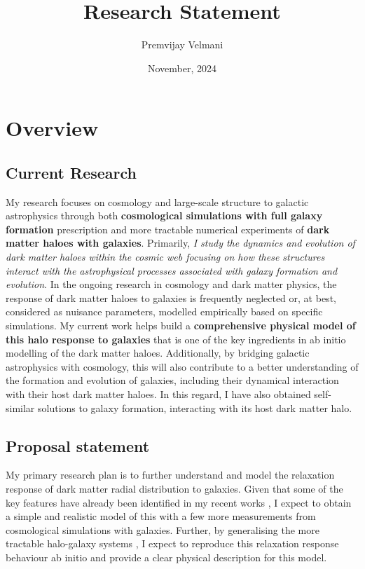 \documentclass[10pt]{article}
\title{Research Statement}
\author{Premvijay Velmani}
\date{November, 2024}
\begin{document}
\maketitle


\section{Overview}
\subsection{Current Research}
My research focuses on cosmology and large-scale structure to galactic astrophysics through both \textbf{cosmological simulations with full galaxy formation} prescription and more tractable numerical experiments of \textbf{dark matter haloes with galaxies}. Primarily, \textit{I study the dynamics and evolution of dark matter haloes within the cosmic web focusing on how these structures interact with the astrophysical processes associated with galaxy formation and evolution}. In the ongoing research in cosmology and dark matter physics, the response of dark matter haloes to galaxies is frequently neglected or, at best, considered as nuisance parameters, modelled empirically based on specific simulations. My current work helps build a \textbf{comprehensive physical model of this halo response to galaxies} that is one of the key ingredients in ab initio modelling of the dark matter haloes. Additionally, by bridging galactic astrophysics with cosmology, this will also contribute to a better understanding of the formation and evolution of galaxies, including their dynamical interaction with their host dark matter haloes. In this regard, I have also obtained self-similar solutions to galaxy formation, interacting with its host dark matter halo.

\subsection{Proposal statement}
My primary research plan is to further understand and model the relaxation response of dark matter radial distribution to galaxies. Given that some of the key features have already been identified in my recent works \cite{2023MNRAS.520.2867V,2024arXiv240708030V,2024arXiv240804864V}, I expect to obtain a simple and realistic model of this with a few more measurements from cosmological simulations with galaxies. Further, by generalising the more tractable halo-galaxy systems \cite{2024JCAP...05..080V}, I expect to reproduce this relaxation response behaviour ab initio and provide a clear physical description for this model. 
\end{document}
